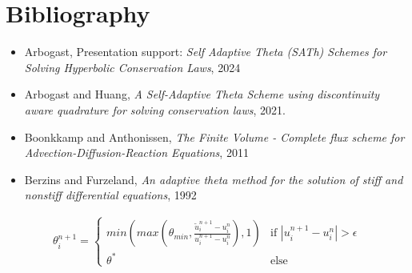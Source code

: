 \documentclass[12pt]{article}
\begin{document}
\section{Bibliography}

\begin{itemize}
    \item Arbogast, Presentation support: \textit{Self Adaptive Theta (SATh) Schemes for Solving Hyperbolic Conservation Laws}, 2024
    \item Arbogast and Huang, \textit{A Self-Adaptive Theta Scheme using discontinuity aware quadrature for solving conservation laws}, 2021.
    \item Boonkkamp and Anthonissen, \textit{The Finite Volume - Complete flux scheme for Advection-Diffusion-Reaction Equations}, 2011
    \item Berzins and Furzeland, \textit{An adaptive theta method for the solution of stiff and nonstiff differential equations}, 1992
\end{itemize}

\begin{align*}
    \theta_i^{n+1} = \begin{cases}
        min(max(\theta_{min}, \frac{\tilde{u}_i^{n+1} - u_i^n}{u_i^{n+1} - u_i^n} ), 1) & \text{if } |u_i^{n+1} - u_i^n| > \epsilon \tag{4} \\
        \theta^* & \text{else} 
    \end{cases}
\end{align*}
\end{document}
